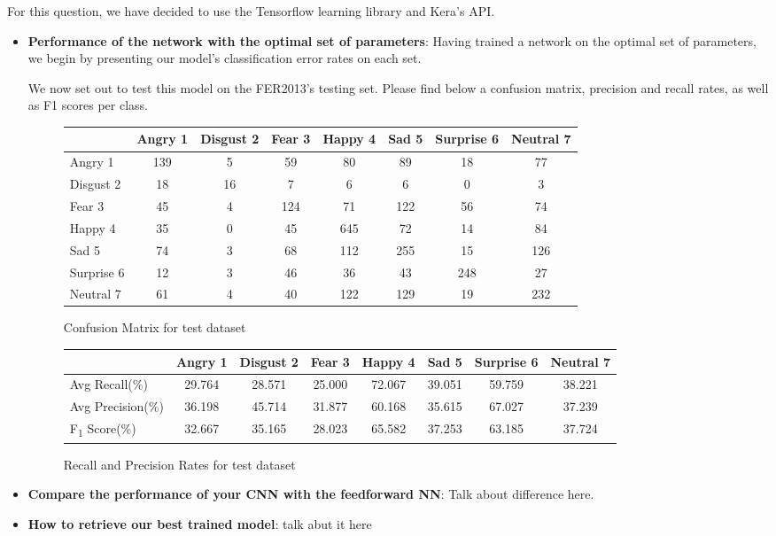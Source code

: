For this question, we have decided to use the Tensorflow learning library and Kera's API.

\begin{itemize}

\item \textbf{Performance of the network with the optimal set of parameters}:
  Having trained a network on the optimal set of parameters,
  we begin by presenting our model's classification error rates on each set.
  
  We now set out to test this model on the FER2013's testing set.
  Please find below a confusion matrix, precision and recall rates, as well as F1 scores per class.
  \begin{figure}[h]
  \begin{center}
    \caption{Confusion Matrix for test dataset}
    \begin{tabular}{ | l || c | c | c | c | c | c | c |}
    \hline
          & Angry 1 & Disgust 2 & Fear 3 & Happy 4 & Sad 5 & Surprise 6 & Neutral 7 \\ \hline \hline
        Angry 1 & 139 & 5 & 59 & 80 & 89 & 18 & 77 \\ \hline
        Disgust 2 & 18 & 16 & 7 & 6 & 6 & 0 & 3 \\ \hline
        Fear 3 & 45 & 4 & 124 & 71 & 122 & 56 & 74 \\ \hline
        Happy 4 & 35 & 0 & 45 & 645 & 72 & 14 & 84 \\ \hline
        Sad 5 & 74 & 3 & 68 & 112 & 255 & 15 & 126 \\ \hline
        Surprise 6 & 12 & 3 & 46 & 36 & 43 & 248 & 27 \\ \hline
        Neutral 7 & 61 & 4 & 40 & 122 & 129 & 19 & 232 \\ \hline
    \end{tabular}
    \label{fig:confusionMatrix}
\end{center}
\end{figure}

  
\begin{figure}[h]
\begin{center}
\caption{Recall and Precision Rates for test dataset}
\begin{tabular}{ | l || c | c | c | c | c | c | c |}
  \hline
         & Angry 1 & Disgust 2 & Fear 3 & Happy 4 & Sad 5 & Surprise 6 & Neutral 7 \\ \hline \hline
        Avg Recall(\%) & 29.764 &28.571 &25.000 &72.067 &39.051 &59.759 &38.221 \\ \hline
        Avg Precision(\%) & 36.198 &45.714 &31.877 &60.168 &35.615 &67.027 &37.239 \\ \hline
        F\textsubscript{1} Score(\%) & 32.667 &35.165 &28.023 &65.582 &37.253 &63.185 &37.724 \\ \hline
    \end{tabular}
    \label{fig:averageRecall}
\end{center}
\end{figure}


\item \textbf{Compare the performance of your CNN with the feedforward NN}:
  Talk about difference here.


\item \textbf{How to retrieve our best trained model}:
  talk abut it here
\end{itemize}
